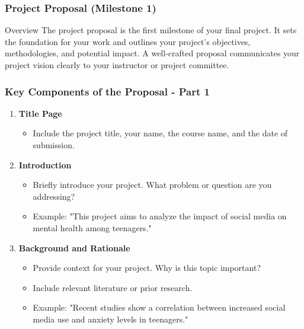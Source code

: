\documentclass{beamer}
\begin{document}
\begin{frame}[fragile]
    \frametitle{Project Proposal (Milestone 1)}
    \begin{block}{Overview}
        The project proposal is the first milestone of your final project. It sets the foundation for your work and outlines your project's objectives, methodologies, and potential impact. A well-crafted proposal communicates your project vision clearly to your instructor or project committee.
    \end{block}
\end{frame}

\begin{frame}[fragile]
    \frametitle{Key Components of the Proposal - Part 1}
    \begin{enumerate}
        \item \textbf{Title Page}
            \begin{itemize}
                \item Include the project title, your name, the course name, and the date of submission.
            \end{itemize}
        
        \item \textbf{Introduction}
            \begin{itemize}
                \item Briefly introduce your project. What problem or question are you addressing?
                \item Example: "This project aims to analyze the impact of social media on mental health among teenagers."
            \end{itemize}

        \item \textbf{Background and Rationale}
            \begin{itemize}
                \item Provide context for your project. Why is this topic important?
                \item Include relevant literature or prior research.
                \item Example: "Recent studies show a correlation between increased social media use and anxiety levels in teenagers."
            \end{itemize}
    \end{enumerate}
\end{frame}
\end{document}
